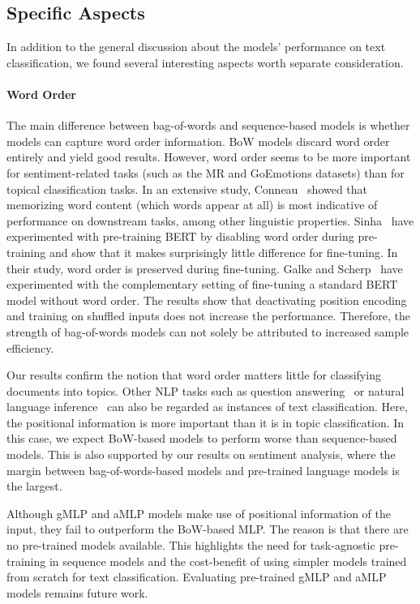 \documentclass[acmsmall,nonacm]{acmart}
\begin{document}
\subsection{Specific Aspects}

In addition to the general discussion about the models' performance on text classification, we found several interesting aspects worth separate consideration.

\paragraph{Word Order}
The main difference between bag-of-words and sequence-based models is whether models can capture word order information.
BoW models discard word order entirely and yield good results. However, word order seems to be more important for sentiment-related tasks (such as the MR and GoEmotions datasets) than for topical classification tasks.
In an extensive study, Conneau~\etal\cite{DBLP:conf/acl/BaroniBLKC18} showed that memorizing word content (which words appear at all) is most indicative of performance on downstream tasks, among other linguistic properties.
Sinha~\etal\cite{sinha2021masked} have experimented with pre-training BERT by disabling word order during pre-training and show that it makes surprisingly little difference for fine-tuning. 
In their study, word order is preserved during fine-tuning. 
Galke and Scherp~\cite{galkescherp-acl2022} have experimented with the complementary setting of fine-tuning a standard BERT model without word order. The results show that deactivating position encoding and training on shuffled inputs does not increase the performance. Therefore, the strength of bag-of-words models can not solely be attributed to increased sample efficiency.

Our results confirm the notion that word order matters little for classifying documents into topics.
Other NLP tasks such as question answering~\cite{DBLP:conf/emnlp/RajpurkarZLL16} or natural language inference~\cite{DBLP:conf/iclr/WangSMHLB19} can also be regarded as instances of text classification. Here, the positional information is more important than it is in topic classification. In this case, we expect BoW-based models to perform worse than sequence-based models. This is also supported by our results on sentiment analysis, where the margin between bag-of-words-based models and pre-trained language models is the largest.

Although gMLP and aMLP models make use of positional information of the input, they fail to outperform the BoW-based MLP. 
The reason is that there are no pre-trained models available.
This highlights the need for task-agnostic pre-training in sequence models and the cost-benefit of using simpler models trained from scratch for text classification.
Evaluating pre-trained gMLP and aMLP models remains future work. 
\end{document}
